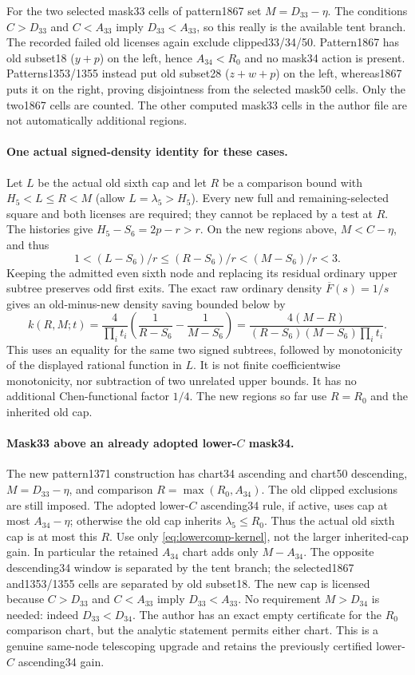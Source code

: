 For the two selected mask33 cells of pattern1867 set $M=D_{33}-\eta$.
The conditions $C>D_{33}$ and $C<A_{33}$ imply $D_{33}<A_{33}$,
so this really is the available tent branch. The recorded failed old
licenses again exclude clipped33/34/50. Pattern1867 has old subset18
($y+p$) on the left, hence $A_{34}<R_0$ and no mask34 action is present.
Patterns1353/1355 instead put old subset28 ($z+w+p$) on the left,
whereas1867 puts it on the right, proving disjointness from the selected
mask50 cells. Only the two1867 cells are counted. The other computed
mask33 cells in the author file are not automatically additional regions.

\paragraph{One actual signed-density identity for these cases.}
Let $L$ be the actual old sixth cap and let $R$ be a comparison bound
with $H_5<L\le R<M$ (allow $L=\lambda_5>H_5$).
Every new full and remaining-selected square and both licenses are required;
they cannot be replaced by a test at $R$. The histories give
$H_5-S_6=2p-r>r$. On the new regions above, $M<C-\eta$, and thus
\[
 1<(L-S_6)/r\le(R-S_6)/r<(M-S_6)/r<3.
\]
Keeping the admitted even sixth node and replacing its residual ordinary
upper subtree preserves odd first exits. The exact raw ordinary density
$\overline F(s)=1/s$ gives an old-minus-new density saving bounded below by
\begin{equation}\label{eq:lowercomp-kernel}
 k(R,M;t)=\frac4{\prod_i t_i}
 \left(\frac1{R-S_6}-\frac1{M-S_6}\right)
 =\frac{4(M-R)}{(R-S_6)(M-S_6)\prod_i t_i}.
\end{equation}
This uses an equality for the same two signed subtrees, followed by
monotonicity of the displayed rational function in $L$. It is not finite
coefficientwise monotonicity, nor subtraction of two unrelated upper bounds.
It has no additional Chen-functional factor $1/4$. The new regions so far
use $R=R_0$ and the inherited old cap.

\paragraph{Mask33 above an already adopted lower-$C$ mask34.}
The new pattern1371 construction has chart34 ascending and chart50
descending, $M=D_{33}-\eta$, and comparison
$R=\max(R_0,A_{34})$. The old clipped exclusions are still imposed.
The adopted lower-$C$ ascending34 rule, if active, uses cap at most
$A_{34}-\eta$; otherwise the old cap inherits $\lambda_5\le R_0$.
Thus the actual old sixth cap is at most this $R$.
Use only \eqref{eq:lowercomp-kernel}, not the larger inherited-cap gain.
In particular the retained $A_{34}$ chart adds only $M-A_{34}$.
The opposite descending34 window is separated by the tent branch;
the selected1867 and1353/1355 cells are separated by old subset18.
The new cap is licensed because $C>D_{33}$ and $C<A_{33}$ imply
$D_{33}<A_{33}$. No requirement $M>D_{34}$ is needed: indeed
$D_{33}<D_{34}$. The author has an exact empty certificate for the
$R_0$ comparison chart, but the analytic statement permits either chart.
This is a genuine same-node telescoping upgrade and retains the previously
certified lower-$C$ ascending34 gain.

